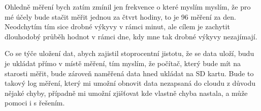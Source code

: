 
Ohledně měření bych zatím zmínil jen frekvence o které myslím myslím, že pro mé účely bude stačit měřit jednou za čtvrt 
hodiny, to je 96 měření za den. Neodchytím tím sice drobné výkyvy v rámci minut, ale cílem je zachytit dlouhodobý průběh 
hodnot v rámci dne, kdy mne tak drobné výkyvy nezajímají. %

Co se týče uložení dat, abych zajistil stoprocentní jistotu, že se data uloží, budu je ukládat přímo v místě měření, tím 
myslím, že počítač, který bude mít na starosti měřit, bude zároveň naměřená data hned ukládat na SD kartu. Bude to 
takový log měření, který mi umožní obnovit data nezapsaná do cloudu z důvodu nějaké chyby, případně mi umožní zjišťovat 
kde vlastně chyba nastala, a může pomoci i s řešením.%

